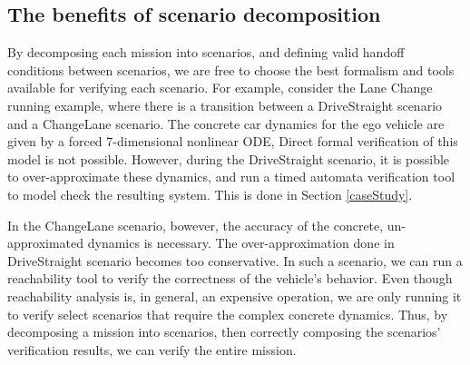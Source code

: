 \subsection{The benefits of scenario decomposition}
\label{mixingFormalisms}

By decomposing each mission into scenarios, and defining valid handoff conditions between scenarios, we are free to choose the best formalism and tools available for verifying each scenario.
For example, consider the Lane Change running example, where there is a transition between a DriveStraight scenario and a ChangeLane scenario.
The concrete car dynamics for the ego vehicle are given by a forced 7-dimensional nonlinear ODE, 
Direct formal verification of this model is not possible. 
However, during the DriveStraight scenario, it is possible to over-approximate these dynamics, and run a timed automata verification tool to model check the resulting system.
This is done in Section \ref{caseStudy}.

In the ChangeLane scenario, bowever, the accuracy of the concrete, un-approximated dynamics is necessary.
The over-approximation done in DriveStraight scenario becomes too conservative. 
In such a scenario, we can run a reachability tool to verify the correctness of the vehicle's behavior.
Even though reachability analysis is, in general, an expensive operation, we are only running it to verify select scenarios that require the complex concrete dynamics.
Thus, by decomposing a mission into scenarios, then correctly composing the scenarios' verification results, we can verify the entire mission.